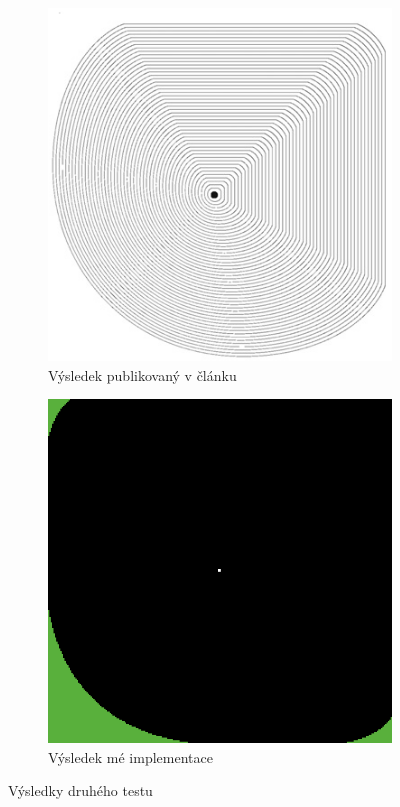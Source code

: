 \documentclass[11pt,a4paper]{scrartcl}
\begin{document}
	
	\begin{figure}[H]
		\centering
		\begin{subfigure} {0.3 \textwidth}
			\includegraphics[width=\linewidth]{art-homogeneous-wh}
			\caption{Výsledek publikovaný v článku}
			\label{fig:test-2-res-art}
		\end{subfigure}
		\hspace*{0.1 \textwidth}
		\begin{subfigure} {0.3 \textwidth}
			\includegraphics[width=\linewidth]{homogeneous-wh}
			\caption{Výsledek mé implementace}
			\label{fig:test-2-res-mine}
		\end{subfigure}
		
		\caption{Výsledky druhého testu}
		\label{fig:test-2-res}
	\end{figure}
	
\end{document}
